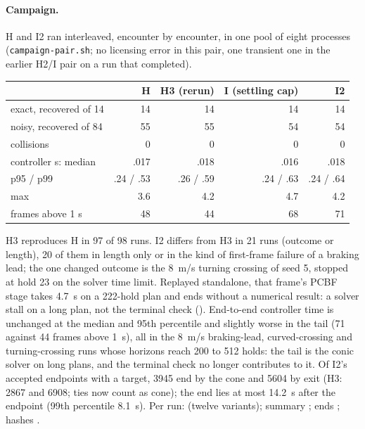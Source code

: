 \documentclass[11pt]{article}
\begin{document}
\paragraph{Campaign.} H and I2 ran interleaved, encounter by encounter, in
one pool of eight processes (\texttt{campaign-pair.sh}; no licensing error in
this pair, one transient one in the earlier H2/I pair on a run that
completed).
\begin{center}
\footnotesize
\begin{tabular}{lrrrr}
\toprule
 & H & H3 (rerun) & I (settling cap) & I2\\
\midrule
exact, recovered of 14 & 14 & 14 & 14 & 14\\
noisy, recovered of 84 & 55 & 55 & 54 & 54\\
collisions & 0 & 0 & 0 & 0\\
controller s: median & .017 & .018 & .016 & .018\\
\phantom{controller s:} p95 / p99 & .24 / .53 & .26 / .59 & .24 / .63 & .24 / .64\\
\phantom{controller s:} max & 3.6 & 4.2 & 4.7 & 4.2\\
frames above 1 s & 48 & 44 & 68 & 71\\
\bottomrule
\end{tabular}
\end{center}
H3 reproduces H in 97 of 98 runs. I2 differs from H3 in 21 runs (outcome or
length), 20 of them in length only or in the kind of first-frame failure of
a braking lead; the one changed outcome is the 8~m/s turning crossing of seed
5, stopped at hold 23 on the solver time limit. Replayed standalone, that
frame's PCBF stage takes 4.7~s on a 222-hold plan and ends without a
numerical result: a solver stall on a long plan, not the terminal check
(). End-to-end controller time is unchanged at the
median and 95th percentile and slightly worse in the tail (71 against 44
frames above 1~s), all in the 8~m/s braking-lead, curved-crossing and
turning-crossing runs whose horizons reach 200 to 512 holds: the tail is the
conic solver on long plans, and the terminal check no longer contributes to
it. Of I2's accepted endpoints with a target, 3945 end by the cone and 5604
by exit (H3: 2867 and 6908; ties now count as cone); the end lies at most
14.2~s after the endpoint (99th percentile 8.1~s). Per run:
 (twelve variants); summary ;
ends ; hashes .
\end{document}
